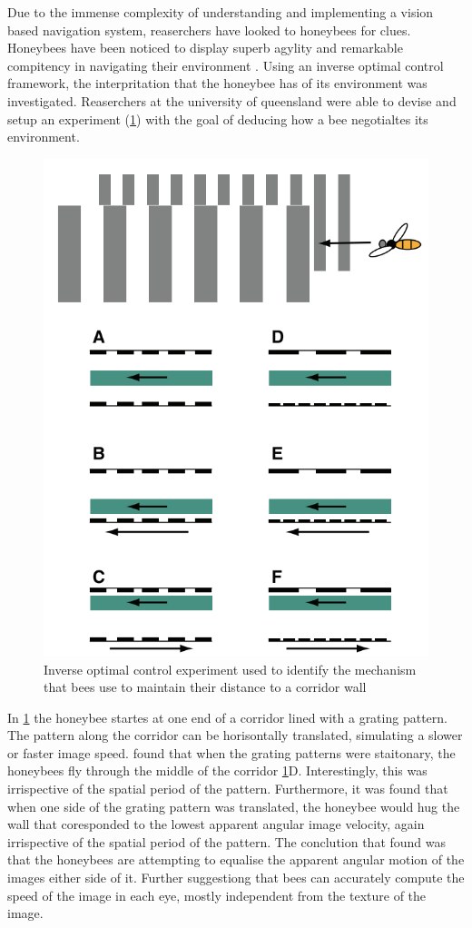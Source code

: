 \documentclass{UoNMCHA}
\numberwithin{equation}{section}
\begin{document}
Due to the immense complexity of understanding and implementing a vision based navigation system, reaserchers have looked to honeybees for clues. Honeybees have been noticed to display superb agylity and remarkable compitency in navigating their environment \citep{srinivasan2012biology}. Using an inverse optimal control framework, the interpritation that the honeybee has of its environment was investigated. Reaserchers at the university of queensland were able to devise and setup an experiment (\cref{fig:BeeExperiment}) with the goal of deducing how a bee negotialtes its environment.

\begin{figure}[ht]
    \begin{center}
        \includegraphics[width=.6\linewidth]{Figures/beeExperiment}
        \caption{Inverse optimal control experiment used to identify the mechanism that bees use to maintain their distance to a corridor wall}
        \label{fig:BeeExperiment}
    \end{center}
\end{figure}

In \cref{fig:BeeExperiment} the honeybee startes at one end of a corridor lined with a grating pattern. The pattern along the corridor can be horisontally translated, simulating a slower or faster image speed.  found that when the grating patterns were staitonary, the honeybees fly through the middle of the corridor \cref{fig:BeeExperiment}D. Interestingly, this was irrispective of the spatial period of the pattern. Furthermore, it was found that when one side of the grating pattern was translated, the honeybee would hug the wall that coresponded to the lowest apparent angular image velocity, again irrispective of the spatial period of the pattern. The conclution that  found was that the honeybees are attempting to equalise the apparent angular motion of the images either side of it. Further suggestiong that bees can accurately compute the speed of the image in each eye, mostly independent from the texture of the image.
\newpage
\end{document}
